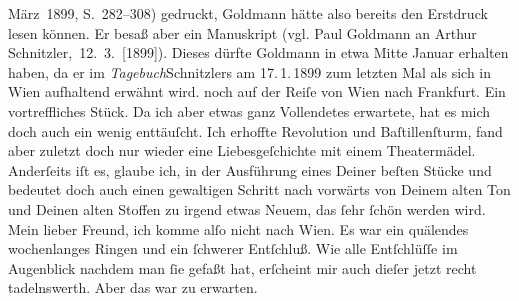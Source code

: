 \begin{ledgroupsized}[t]{13cm}
{{{                        März 1899, S. 282–308) gedruckt, Goldmann hätte also bereits den Erstdruck
                  lesen können. Er besaß aber ein Manuskript (vgl. Paul Goldmann an Arthur Schnitzler, 12. 3. [1899]). Dieses dürfte Goldmann in etwa Mitte Januar erhalten haben,
                  da er im \emph{Tagebuch}Schnitzlers am 17. 1. 1899 zum
                  letzten Mal als sich in Wien aufhaltend erwähnt
                  wird.}}}\label{K_L02868-88h} noch auf der Reiſe von Wien nach
                  Frankfurt. Ein vortreffliches Stück. Da ich aber etwas ganz Vollendetes
               erwartete, hat es mich doch auch ein wenig enttäuſcht. Ich erhoffte Revolution und
                  Baſtillenſturm, fand aber zuletzt doch nur
               wieder eine Liebesgeſchichte mit einem Theatermädel. Anderſeits iſt es, glaube ich,
               in der Ausführung eines Deiner beſten Stücke und bedeutet doch \strikeout{\textcolor{gray}{einen}} auch einen gewaltigen Schritt nach vorwärts  von Deinem alten Ton und Deinen alten
               Stoffen zu irgend etwas Neuem, das ſehr ſchön werden wird.\pend
           \pstart
           {\pb}Mein lieber Freund, ich komme alſo nicht nach Wien. Es war ein quälendes wochenlanges Ringen und
               ein ſchwerer Entſchluß. Wie alle Entſchlüſſe im Augenblick nachdem man ſie gefaßt
               hat, erſcheint mir auch dieſer jetzt recht tadelnswerth. Aber das war zu
               erwarten.\pend

\end{ledgroupsized}
